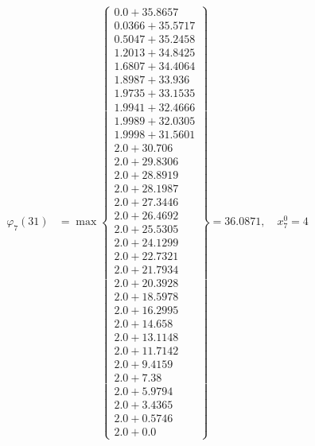 \documentclass{article}
\begin{document}
\begin{align*}
  
\varphi_{7}(31) &= \max \left\{ \begin{array}{c}
0.0 + 35.8657 \\
 0.0366 + 35.5717 \\
 0.5047 + 35.2458 \\
 1.2013 + 34.8425 \\
 1.6807 + 34.4064 \\
 1.8987 + 33.936 \\
 1.9735 + 33.1535 \\
 1.9941 + 32.4666 \\
 1.9989 + 32.0305 \\
 1.9998 + 31.5601 \\
 2.0 + 30.706 \\
 2.0 + 29.8306 \\
 2.0 + 28.8919 \\
 2.0 + 28.1987 \\
 2.0 + 27.3446 \\
 2.0 + 26.4692 \\
 2.0 + 25.5305 \\
 2.0 + 24.1299 \\
 2.0 + 22.7321 \\
 2.0 + 21.7934 \\
 2.0 + 20.3928 \\
 2.0 + 18.5978 \\
 2.0 + 16.2995 \\
 2.0 + 14.658 \\
 2.0 + 13.1148 \\
 2.0 + 11.7142 \\
 2.0 + 9.4159 \\
 2.0 + 7.38 \\
 2.0 + 5.9794 \\
 2.0 + 3.4365 \\
 2.0 + 0.5746 \\
 2.0 + 0.0
\end{array} \right\}=36.0871,\quad x_{7}^0=4\\
  
  
  

\end{align*}
\end{document}
